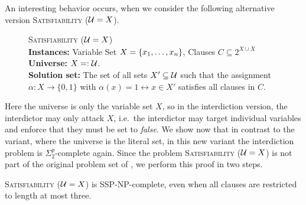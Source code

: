 An interesting behavior occurs, when we consider the following alternative version \textsc{Satisfiability ($\mathcal{U} = X$)}. 
\begin{samepage}
    \begin{mdframed}
    	\begin{description}
        \item[]\textsc{Satisfiability  ($\mathcal{U} = X$)}\hfill\\
        \textbf{Instances:} Variable Set $X = \{ x_1, \ldots, x_n \}$, Clauses $C \subseteq 2^{X \cup \overline X}$ \\
        \textbf{Universe:} $X =: \mathcal{U}$.\\
        \textbf{Solution set:} The set of all sets $X' \subseteq \mathcal{U}$ such that the assignment $\alpha: X \rightarrow \{0,1\}$ with $\alpha(x) = 1 \leftrightarrow x \in X'$ satisfies all clauses in $C$.
        \end{description}
    \end{mdframed}
\end{samepage}
Here the universe is only the variable set $X$, so in the interdiction version, the interdictor may only attack $X$, i.e.\ the interdictor may target individual variables and enforce that they must be set to \emph{false}. 
We show now that in contrast to the variant, where the universe is the literal set, in this new variant the interdiction problem is $\Sigma^p_2$-complete again. 
Since the problem \textsc{Satisfiability ($\mathcal{U} = X$)} is not part of the original problem set of \cite{gruene2024completeness}, we perform this proof in two steps.
\begin{lemma}
    \textsc{Satisfiability ($\mathcal{U} = X$)} is SSP-NP-complete, even when all clauses are restricted to length at most three.
\end{lemma}
